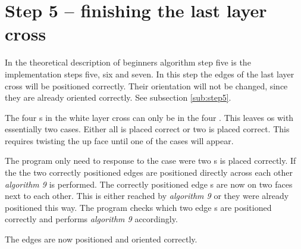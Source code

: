 \section{Step 5 -- finishing the last layer cross}
In the theoretical description of beginners algorithm step five is the implementation steps five, six and seven. 
In this step the edges of the last layer cross will be positioned correctly. Their orientation will not be changed, since they are already oriented correctly. See subsection \ref{sub:step5}.

The four \cpiece{}s in the white layer cross can only be in the four \cubicle{}. This leaves os with essentially two cases. Either all is placed correct or two is placed correct. This requires twisting the up face until one of the cases will appear. 

The program only need to response to the case were two \cpiece{}s is placed correctly. 
If the the two correctly positioned edges are positioned directly across each other \textit{algorithm 9} is performed.
The correctly positioned edge \cpiece{}s are now on two faces next to each other. This is either reached by \textit{algorithm 9} or they were already positioned this way.
The program checks which two edge \cpiece{}s are positioned correctly and performs \textit{algorithm 9} accordingly. 

The edges are now positioned and oriented correctly.